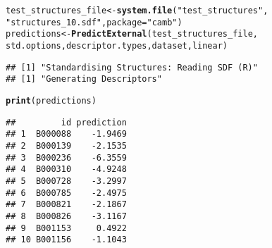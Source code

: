 \documentclass[twoside,a4wide,12pt]{article}\usepackage[]{graphicx}\usepackage[]{color}
\makeatletter
\newcommand{\hlstr}[1]{\textcolor[rgb]{0.192,0.494,0.8}{#1}}%
\newcommand{\hlstd}[1]{\textcolor[rgb]{0.345,0.345,0.345}{#1}}%
\newcommand{\hlkwb}[1]{\textcolor[rgb]{0.69,0.353,0.396}{#1}}%
\newcommand{\hlkwc}[1]{\textcolor[rgb]{0.333,0.667,0.333}{#1}}%
\newcommand{\hlkwd}[1]{\textcolor[rgb]{0.737,0.353,0.396}{\textbf{#1}}}%
\newenvironment{kframe}{%
 \def\at@end@of@kframe{}%
 \ifinner\ifhmode%
  \def\at@end@of@kframe{\end{minipage}}%
  \begin{minipage}{\columnwidth}%
 \fi\fi%
 \def\FrameCommand##1{\hskip\@totalleftmargin \hskip-\fboxsep
 \colorbox{shadecolor}{##1}\hskip-\fboxsep
     \hskip-\linewidth \hskip-\@totalleftmargin \hskip\columnwidth}%
 \MakeFramed {\advance\hsize-\width
   \@totalleftmargin\z@ \linewidth\hsize
   \@setminipage}}%
 {\par\unskip\endMakeFramed%
 \at@end@of@kframe}
\newenvironment{knitrout}{}{} %
\makeatother
\begin{document}
\begin{knitrout}
\color{fgcolor}\begin{kframe}
\begin{alltt}
\hlstd{test_structures_file} \hlkwb{<-} \hlkwd{system.file}\hlstd{(}\hlstr{"test_structures"}\hlstd{,}
    \hlstr{"structures_10.sdf"}\hlstd{,} \hlkwc{package} \hlstd{=} \hlstr{"camb"}\hlstd{)}
\hlstd{predictions} \hlkwb{<-} \hlkwd{PredictExternal}\hlstd{(test_structures_file,}
    \hlstd{std.options, descriptor.types, dataset, linear)}
\end{alltt}
\begin{verbatim}
## [1] "Standardising Structures: Reading SDF (R)"
## [1] "Generating Descriptors"
\end{verbatim}
\begin{alltt}
\hlkwd{print}\hlstd{(predictions)}
\end{alltt}
\begin{verbatim}
##         id prediction
## 1  B000088    -1.9469
## 2  B000139    -2.1535
## 3  B000236    -6.3559
## 4  B000310    -4.9248
## 5  B000728    -3.2997
## 6  B000785    -2.4975
## 7  B000821    -2.1867
## 8  B000826    -3.1167
## 9  B001153     0.4922
## 10 B001156    -1.1043
\end{verbatim}
\end{kframe}
\end{knitrout}

\printbibliography
\end{document}
